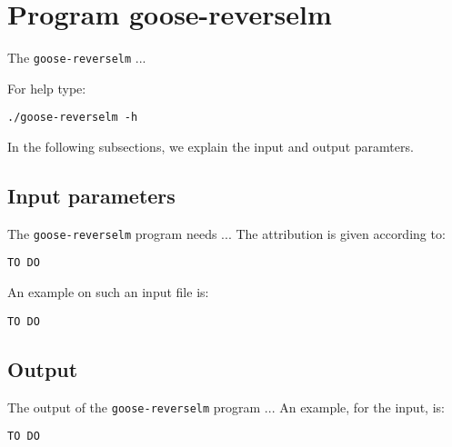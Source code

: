 \section{Program goose-reverselm}
The \texttt{goose-reverselm} ...

For help type:
\begin{lstlisting}
./goose-reverselm -h
\end{lstlisting}
In the following subsections, we explain the input and output paramters.

\subsection{Input parameters}

The \texttt{goose-reverselm} program needs ...
The attribution is given according to:
\begin{lstlisting}
TO DO
\end{lstlisting}

An example on such an input file is:
\begin{lstlisting}
TO DO
\end{lstlisting}

\subsection{Output}
The output of the \texttt{goose-reverselm} program ...
An example, for the input, is:
\begin{lstlisting}
TO DO
\end{lstlisting}